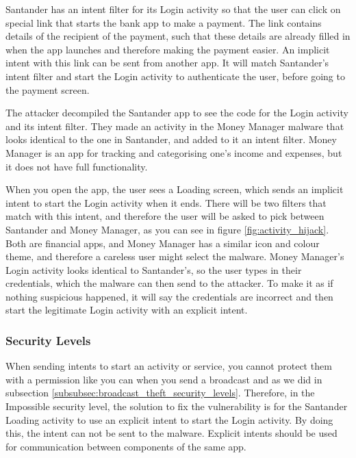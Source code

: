     Santander has an intent filter for its Login activity so that the user can click on special link that starts the bank app to make a payment. The link contains details of the recipient of the payment, such that these details are already filled in when the app launches and therefore making the payment easier. An implicit intent with this link can be sent from another app. It will match Santander's intent filter and start the Login activity to authenticate the user, before going to the payment screen.

    The attacker decompiled the Santander app to see the code for the Login activity and its intent filter. They made an activity in the Money Manager malware that looks identical to the one in Santander, and added to it an intent filter. Money Manager is an app for tracking and categorising one's income and expenses, but it does not have full functionality.
    
    When you open the app, the user sees a Loading screen, which sends an implicit intent to start the Login activity when it ends. There will be two filters that match with this intent, and therefore the user will be asked to pick between Santander and Money Manager, as you can see in figure \ref{fig:activity_hijack}. Both are financial apps, and Money Manager has a similar icon and colour theme, and therefore a careless user might select the malware. Money Manager's Login activity looks identical to Santander's, so the user types in their credentials, which the malware can then send to the attacker. To make it as if nothing suspicious happened, it will say the credentials are incorrect and then start the legitimate Login activity with an explicit intent.
    
    \subsubsection{Security Levels}
        \label{subsubsec:activity_hijack_security_levels}
        
    When sending intents to start an activity or service, you cannot protect them with a permission like you can when you send a broadcast and as we did in subsection \ref{subsubsec:broadcast_theft_security_levels}. Therefore, in the Impossible security level, the solution to fix the vulnerability is for the Santander Loading activity to use an explicit intent to start the Login activity. By doing this, the intent can not be sent to the malware. Explicit intents should be used for communication between components of the same app.

